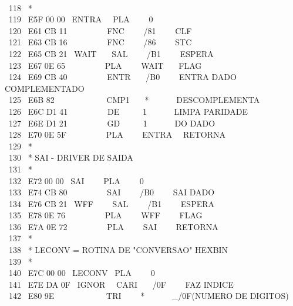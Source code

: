 \documentclass[a4paper,12pt]{article}
\begin{document}
\newpage

\noindent \\[2em]

\noindent \ 118 \ *\\
\phantom \ 119 \ E5F 00 00 \ ENTRA \ \ PLA \ \ \ \ 0\\
\phantom \ 120 \ E61 CB 11 \ \ \ \ \ \ \ \ \ FNC \ \ \ \ /81 \ \ \ \ CLF\\
\phantom \ 121 \ E63 CB 16 \ \ \ \ \ \ \ \ \ FNC \ \ \ \ /86 \ \ \ \ STC\\
\phantom \ 122 \ E65 CB 21 \ WAIT \ \ \ SAL \ \ \ \ /B1 \ \ \ \ ESPERA\\
\phantom \ 123 \ E67 0E 65 \ \ \ \ \ \ \ \ \ PLA \ \ \ \ WAIT \ \ \ FLAG\\
\phantom \ 124 \ E69 CB 40 \ \ \ \ \ \ \ \ \ ENTR \ \ \ /B0 \ \ \ \ ENTRA DADO COMPLEMENTADO\\
\phantom \ 125 \ E6B 82 \ \ \ \ \ \ \ \ \ \ \ \ CMP1 \ \ \ * \ \ \ \ \ \ DESCOMPLEMENTA\\
\phantom \ 126 \ E6C D1 41 \ \ \ \ \ \ \ \ \ DE \ \ \ \ \ 1 \ \ \ \ \ \ LIMPA PARIDADE\\
\phantom \ 127 \ E6E D1 21 \ \ \ \ \ \ \ \ \ GD \ \ \ \ \ 1 \ \ \ \ \ \ DO DADO\\
\phantom \ 128 \ E70 0E 5F \ \ \ \ \ \ \ \ \ PLA \ \ \ \ ENTRA \ \ RETORNA\\
\phantom \ 129 \ *\\
\phantom \ 130 \ * SAI - DRIVER DE SAIDA\\
\phantom \ 131 \ *\\
\phantom \ 132 \ E72 00 00 \ SAI \ \ \ \ PLA \ \ \ \ 0\\
\phantom \ 133 \ E74 CB 80 \ \ \ \ \ \ \ \ \ SAI \ \ \ \ /B0 \ \ \ \ SAI DADO\\
\phantom \ 134 \ E76 CB 21 \ WFF \ \ \ \ SAL \ \ \ \ /B1 \ \ \ \ ESPERA\\
\phantom \ 135 \ E78 0E 76 \ \ \ \ \ \ \ \ \ PLA \ \ \ \ WFF \ \ \ \ FLAG\\
\phantom \ 136 \ E7A 0E 72 \ \ \ \ \ \ \ \ \ PLA \ \ \ \ SAI \ \ \ \ RETORNA\\
\phantom \ 137 \ *\\
\phantom \ 138 \ * LECONV = ROTINA DE "CONVERSAO" HEXBIN\\
\phantom \ 139 \ *\\
\phantom \ 140 \ E7C 00 00 \ LECONV \ PLA \ \ \ \ 0\\
\phantom \ 141 \ E7E DA 0F \ IGNOR \ \ CARI \ \ \ /0F \ \ \ \ FAZ INDICE\\
\phantom \ 142 \ E80 9E \ \ \ \ \ \ \ \ \ \ \ \ TRI \ \ \ \ * \ \ \ \ \ \ \_/0F(NUMERO DE DIGITOS)\\
\end{document}
